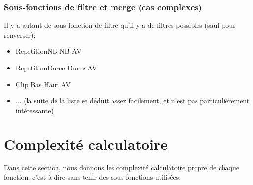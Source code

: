 \documentclass[12pt,a4paper]{article}
\begin{document}
\subsubsection{Sous-fonctions de filtre et merge (cas complexes)}
Il y a autant de sous-fonction de filtre qu'il y a de filtres possibles (sauf pour renverser):
\begin{itemize}
	\item  {RepetitionNB NB AV}
	\item {RepetitionDuree Duree AV}
	\item {Clip Bas Haut AV}
	\item ... (la suite de la liste se déduit assez facilement, et n'est pas particulièrement intéressante)
\end{itemize}

\section{Complexité calculatoire}
Dans cette section, nous donnons les complexité calculatoire
propre de chaque fonction, c'est à dire sans tenir des sous-fonctions
utilisées.
\end{document}

